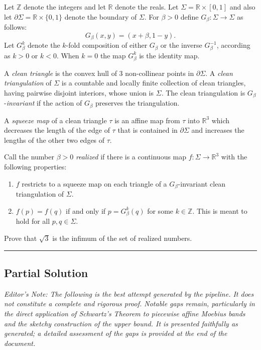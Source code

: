 \documentclass[12pt]{article}
\begin{document}
Let $\mathbb{Z}$ denote the integers and let $\mathbb{R}$ denote the reals.
Let $\Sigma= \mathbb{R} \times [0,1]$ and also let $\partial \Sigma=\mathbb{R} \times \{0,1\}$ denote the boundary of $\Sigma$. 
For $\beta>0$ define $G_{\beta}: \Sigma \to \Sigma$ as follows:
\[
G_{\beta}(x,y)=(x+\beta,1-y).
\]
Let $G_{\beta}^k$ denote the $k$-fold composition of either $G_{\beta}$ or the inverse $G_{\beta}^{-1}$, according as $k>0$ or $k<0$. When $k=0$ the map $G_{\beta}^k$ is the identity map.

A \textit{clean triangle} is the convex hull of $3$ non-collinear points in $\partial \Sigma$. 
A \textit{clean triangulation} of $\Sigma$ is a countable and locally finite collection of clean triangles, having pairwise disjoint interiors, whose union is $\Sigma$. The clean triangulation is $G_{\beta}$-\textit{invariant} if the action of $G_{\beta}$ preserves the triangulation.

A \textit{squeeze map} of a clean triangle $\tau$ is an affine map from $\tau$ into $\mathbb{R}^3$ which decreases the length of the edge of $\tau$ that is contained in $\partial \Sigma$ and increases the lengths of the other two edges of $\tau$.

Call the number $\beta>0$ \textit{realized} if there is a continuous map $f: \Sigma \to \mathbb{R}^3$ with the following properties:
\begin{enumerate}
\item $f$ restricts to a squeeze map on each triangle of a $G_{\beta}$-invariant clean triangulation of $\Sigma$.
\item $f(p)=f(q)$ if and only if $p=G_{\beta}^k(q)$ for some $k \in \mathbb{Z}$. This is meant to hold for all $p,q \in \Sigma$.
\end{enumerate}
Prove that $\sqrt 3$ is the infimum of the set of realized numbers.

\vspace{1em}
\hrule
\vspace{1em}

\subsection*{Partial Solution}

\textit{Editor's Note: The following is the best attempt generated by the pipeline. It does not constitute a complete and rigorous proof. Notable gaps remain, particularly in the direct application of Schwartz's Theorem to piecewise affine Moebius bands and the sketchy construction of the upper bound. It is presented faithfully as generated; a detailed assessment of the gaps is provided at the end of the document.}
\end{document}
